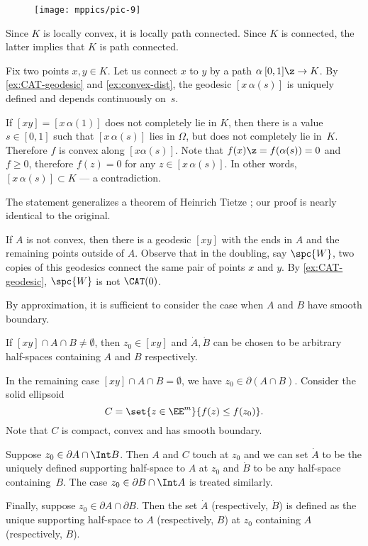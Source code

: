 \begin{wrapfigure}{o}{45 mm}
\vskip-4mm
\centering
\texttt{[image: mppics/pic-9]}
\end{wrapfigure}

Since $K$ is locally convex,
it is locally path connected.
Since $K$ is connected, the latter implies that $K$ is path connected.

Fix two points $x,y\in K$. 
Let us connect $x$ to $y$ by a path $\alpha\:[0,1]\z\to K$.
By \ref{ex:CAT-geodesic} and \ref{ex:convex-dist}, the geodesic $[x\,\alpha(s)]$ 
is uniquely defined and depends continuously on~$s$.

If $[xy]=[x\,\alpha(1)]$ does not completely lie in $K$, then 
there is a value $s\in [0,1]$ such that $[x\,\alpha(s)]$ 
lies in $\Omega$,
but does not completely lie in~$K$.
Therefore $f$ is convex 
along $[x\alpha(s)]$.
Note that $f(x)\z=f(\alpha(s))=0$ and $f\ge 0$, 
therefore $f(z)= 0$ for any $z\in [x\,\alpha(s)]$.
In other words, $[x\,\alpha(s)]\subset K$ --- a contradiction.

The statement generalizes a theorem of Heinrich Tietze \cite{tietze}; our proof is nearly identical to the original.

If $A$ is not convex, then there is a geodesic $[xy]$ with the ends in $A$ and the remaining points outside of $A$.
Observe that in the doubling, say $\spc{W}$, two copies of this geodesics connect the same pair of points $x$ and $y$.
By \ref{ex:CAT-geodesic}, $\spc{W}$ is not $\CAT(0)$.

By approximation, it is sufficient to consider the case when 
$A$ and $B$ have smooth boundary. 

If $[xy]\cap A\cap B\ne \emptyset$, then $z_0\in [xy]$ and $\dot A, \dot B$ can be chosen to be arbitrary half-spaces containing $A$ and $B$ respectively.  

In the remaining case $[xy]\cap A\cap B=\emptyset$, 
we have $z_0\in\partial (A\cap B)$.  
Consider the solid ellipsoid
\[C=\set{z\in\EE^m}{f(z)\le f(z_0)}.\] 
Note that $C$ is compact, convex and has  smooth boundary. 

Suppose $z_0\in\partial  A \cap \Int B$. 
Then $A$ and $C$ touch at $z_0$ and we can set $\dot A$ to be the uniquely defined supporting half-space to $A$  at $z_0$ and $\dot B$ to be any half-space containing~$B$. 
The case $z_0\in\partial B \cap \Int A$ is treated similarly.


Finally, suppose $z_0\in\partial A\cap\partial B$. 
Then the set  $\dot A$ (respectively, $\dot B$) is defined as the unique supporting half-space to $A$ (respectively, $B$) at $z_0$ containing $A$ (respectively, $B$).

